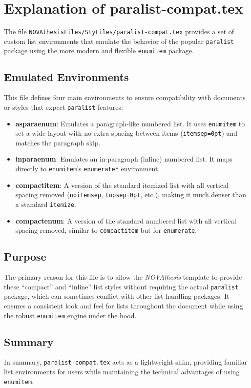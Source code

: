 

\chapter{Explanation of paralist-compat.tex}
\label{annex:paralist-compat}

The file \texttt{NOVAthesisFiles/StyFiles/paralist-compat.tex} provides a set of custom list environments that emulate the behavior of the popular \texttt{paralist} package using the more modern and flexible \texttt{enumitem} package.

\section{Emulated Environments}
This file defines four main environments to ensure compatibility with documents or styles that expect \texttt{paralist} features:

\begin{itemize}
    \item \textbf{asparaenum}: Emulates a paragraph-like numbered list. It uses \texttt{enumitem} to set a wide layout with no extra spacing between items (\texttt{itemsep=0pt}) and matches the paragraph skip.
    \item \textbf{inparaenum}: Emulates an in-paragraph (inline) numbered list. It maps directly to \texttt{enumitem}'s \texttt{enumerate*} environment.
    \item \textbf{compactitem}: A version of the standard itemized list with all vertical spacing removed (\texttt{noitemsep}, \texttt{topsep=0pt}, etc.), making it much denser than a standard \texttt{itemize}.
    \item \textbf{compactenum}: A version of the standard numbered list with all vertical spacing removed, similar to \texttt{compactitem} but for \texttt{enumerate}.
\end{itemize}

\section{Purpose}
The primary reason for this file is to allow the \emph{NOVAthesis} template to provide these ``compact'' and ``inline'' list styles without requiring the actual \texttt{paralist} package, which can sometimes conflict with other list-handling packages. It ensures a consistent look and feel for lists throughout the document while using the robust \texttt{enumitem} engine under the hood.

\section{Summary}
In summary, \texttt{paralist-compat.tex} acts as a lightweight shim, providing familiar list environments for users while maintaining the technical advantages of using \texttt{enumitem}.
